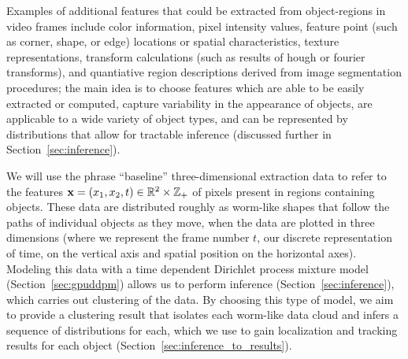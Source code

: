 \documentclass[smallcondensed, final]{svjour3}
\begin{document}
Examples of additional features that could be extracted from object-regions in video frames include color information, pixel intensity values, feature point (such as corner, shape, or edge) locations or spatial characteristics, texture representations, transform calculations (such as results of hough or fourier transforms), and quantiative region descriptions derived from image segmentation procedures; the main idea is to choose features which are able to be easily extracted or computed, capture variability in the appearance of objects, are applicable to a wide variety of object types, and can be represented by distributions that allow for tractable inference (discussed further in Section~\ref{sec:inference}).

We will use the phrase ``baseline'' three-dimensional extraction data to refer to the features $\bold{x} = ( x_{1}, x_{2}, t ) \in \mathbb{R}^{2} \times \mathbb{Z}_{+}$ of pixels present in regions containing objects. These data are distributed roughly as worm-like shapes that follow the paths of individual objects as they move, when the data are plotted in three dimensions (where we represent the frame number $t$, our discrete representation of time, on the vertical axis and spatial position on the horizontal axes). Modeling this data with a time dependent Dirichlet process mixture model (Section~\ref{sec:gpuddpm}) allows us to perform inference (Section~\ref{sec:inference}), which carries out clustering of the data. By choosing this type of model, we aim to provide a clustering result that isolates each worm-like data cloud and infers a sequence of distributions for each, which we use to gain localization and tracking results for each object (Section~\ref{sec:inference_to_results}).




\end{document}
